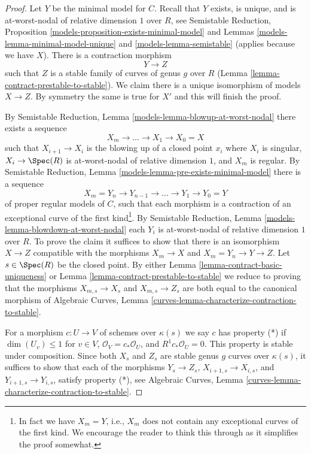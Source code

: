 \begin{proof}
Let $Y$ be the minimal model for $C$. Recall that $Y$ exists, is
unique, and is at-worst-nodal of relative dimension $1$ over $R$, see
Semistable Reduction,
Proposition \ref{models-proposition-exists-minimal-model} and
Lemmas \ref{models-lemma-minimal-model-unique} and
\ref{models-lemma-semistable} (applies because we have $X$).
There is a contraction morphism
$$
Y \longrightarrow Z
$$
such that $Z$ is a stable family of curves of genus $g$ over $R$
(Lemma \ref{lemma-contract-prestable-to-stable}). We claim
there is a unique isomorphism of models $X \to Z$.
By symmetry the same is true for $X'$ and this will finish the proof.

\medskip\noindent
By Semistable Reduction, Lemma \ref{models-lemma-blowup-at-worst-nodal}
there exists a sequence
$$
X_m \to \ldots \to X_1 \to X_0 = X
$$
such that $X_{i + 1} \to X_i$ is the blowing up of a closed point
$x_i$ where $X_i$ is singular, $X_i \to \Spec(R)$ is at-worst-nodal
of relative dimension $1$, and $X_m$ is regular.
By Semistable Reduction, Lemma \ref{models-lemma-pre-exists-minimal-model}
there is a sequence
$$
X_m = Y_n \to Y_{n - 1} \to \ldots \to Y_1 \to Y_0 = Y
$$
of proper regular models of $C$, such that each morphism is a
contraction of an exceptional curve of the first kind\footnote{In fact
we have $X_m = Y$, i.e., $X_m$ does not contain any exceptional curves
of the first kind. We encourage the reader to think this through
as it simplifies the proof somewhat.}.
By Semistable Reduction, Lemma \ref{models-lemma-blowdown-at-worst-nodal}
each $Y_i$ is at-worst-nodal of relative dimension $1$ over $R$.
To prove the claim it suffices to show that there is an isomorphism
$X \to Z$ compatible with the morphisms $X_m \to X$
and $X_m = Y_n \to Y \to Z$. Let $s \in \Spec(R)$ be the closed point.
By either
Lemma \ref{lemma-contract-basic-uniqueness} or
Lemma \ref{lemma-contract-prestable-to-stable}
we reduce to proving that the morphisms
$X_{m, s} \to X_s$ and
$X_{m, s} \to Z_s$
are both equal to the canonical morphism of
Algebraic Curves, Lemma \ref{curves-lemma-characterize-contraction-to-stable}.

\medskip\noindent
For a morphism $c : U \to V$ of schemes over $\kappa(s)$
we say $c$ has property (*) if $\dim(U_v) \leq 1$ for $v \in V$,
$\mathcal{O}_V = c_*\mathcal{O}_U$, and $R^1c_*\mathcal{O}_U = 0$.
This property is stable under composition.
Since both $X_s$ and $Z_s$ are stable genus $g$ curves over $\kappa(s)$,
it suffices to show that each of the morphisms $Y_s \to Z_s$,
$X_{i + 1, s} \to X_{i, s}$, and $Y_{i + 1, s} \to Y_{i, s}$,
satisfy property (*), see
Algebraic Curves, Lemma \ref{curves-lemma-characterize-contraction-to-stable}.


\end{proof}
